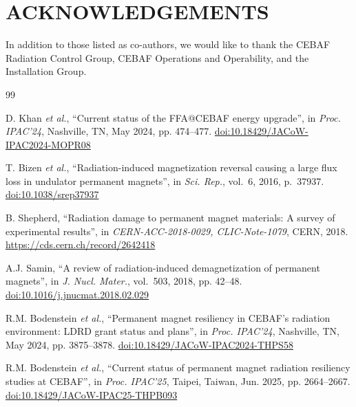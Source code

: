 \documentclass[a4paper,
               ]{jacow}
\begin{document}
\section{ACKNOWLEDGEMENTS}
In addition to those listed as co-authors, we would like to thank the CEBAF Radiation Control Group, CEBAF Operations and Operability, and the Installation Group.

%
%
    {\printbibliography}%
    {%

    \begin{thebibliography}{99}   %

            D. Khan \emph{et al.},
            ``Current status of the FFA@CEBAF energy upgrade'',
            in \emph{Proc. IPAC'24}, Nashville, TN, May 2024, pp. 474--477.
            \url{doi:10.18429/JACoW-IPAC2024-MOPR08}

            T. Bizen \emph{et al.},
            ``Radiation-induced magnetization reversal causing a large flux loss in undulator permanent magnets'',
            in \emph{Sci. Rep.}, vol.~6, 2016, p.~37937.
            \url{doi:10.1038/srep37937}

           B. Shepherd,
           ``Radiation damage to permanent magnet materials: A survey of experimental results'',
           in \emph{CERN-ACC-2018-0029, CLIC-Note-1079}, CERN, 2018.
           \url{https://cds.cern.ch/record/2642418}

            A.J. Samin,
            ``A review of radiation-induced demagnetization of permanent magnets'',
            in \emph{J. Nucl. Mater.}, vol.~503, 2018, pp. 42--48.
            \url{doi:10.1016/j.jnucmat.2018.02.029}

            R.M. Bodenstein \emph{et al.},
            ``Permanent magnet resiliency in CEBAF's radiation environment: LDRD grant status and plans'',
            in \emph{Proc. IPAC'24}, Nashville, TN, May 2024, pp. 3875--3878.
            \url{doi:10.18429/JACoW-IPAC2024-THPS58}

             R.M. Bodenstein \emph{et al.},
            ``Current status of permanent magnet radiation resiliency studies at CEBAF'',
            in \emph{Proc. IPAC'25}, Taipei, Taiwan, Jun. 2025, pp. 2664--2667.
            \url{doi:10.18429/JACoW-IPAC25-THPB093}


\end{thebibliography}}
\end{document}
